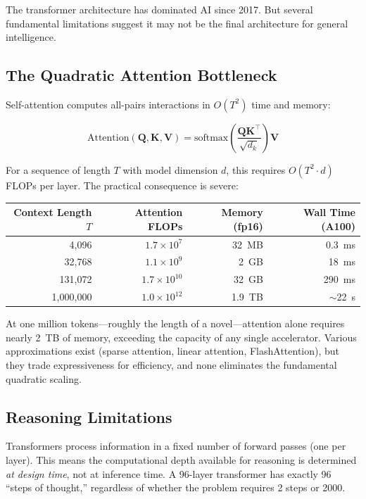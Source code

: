 The transformer architecture \citep{vaswani2017attention} has dominated AI since 2017. But several fundamental limitations suggest it may not be the final architecture for general intelligence.

\subsection{The Quadratic Attention Bottleneck}

Self-attention computes all-pairs interactions in $O(T^2)$ time and memory:

\begin{equation}
\text{Attention}(\mathbf{Q}, \mathbf{K}, \mathbf{V}) = \text{softmax}\!\left(\frac{\mathbf{Q}\mathbf{K}^\top}{\sqrt{d_k}}\right)\mathbf{V}
\label{eq:attention-reminder}
\end{equation}

For a sequence of length $T$ with model dimension $d$, this requires $O(T^2 \cdot d)$ FLOPs per layer. The practical consequence is severe:

\begin{center}
\renewcommand{\arraystretch}{1.2}
\begin{tabular}{rrrr}
\toprule
\textbf{Context Length $T$} & \textbf{Attention FLOPs} & \textbf{Memory (fp16)} & \textbf{Wall Time (A100)} \\
\midrule
4,096 & $1.7 \times 10^{7}$ & 32~MB & 0.3~ms \\
32,768 & $1.1 \times 10^{9}$ & 2~GB & 18~ms \\
131,072 & $1.7 \times 10^{10}$ & 32~GB & 290~ms \\
1,000,000 & $1.0 \times 10^{12}$ & 1.9~TB & $\sim$22~s \\
\bottomrule
\end{tabular}
\end{center}

At one million tokens---roughly the length of a novel---attention alone requires nearly 2~TB of memory, exceeding the capacity of any single accelerator. Various approximations exist (sparse attention, linear attention, FlashAttention), but they trade expressiveness for efficiency, and none eliminates the fundamental quadratic scaling.

\subsection{Reasoning Limitations}

Transformers process information in a fixed number of forward passes (one per layer). This means the computational depth available for reasoning is determined \emph{at design time}, not at inference time. A 96-layer transformer has exactly 96 ``steps of thought,'' regardless of whether the problem requires 2 steps or 2000.

